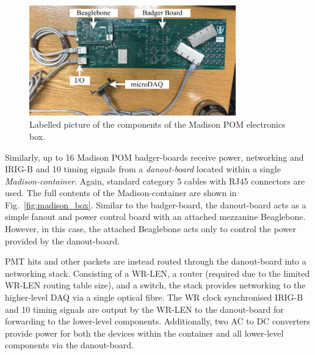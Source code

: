\begin{figure} %
    \includegraphics[width=0.8\textwidth]{diagrams/5-daq/madison_plane.pdf}
    \caption[Labelled picture of the components of the Madison POM electronics box.]
    {Labelled picture of the components of the Madison POM electronics box.}
    \label{fig:madison_plane}
\end{figure}

Similarly, up to 16 Madison POM badger-boards receive power, networking and IRIG-B and
\unit{10}{} timing signals from a \emph{danout-board} located within a single
\emph{Madison-container}. Again, standard category 5 cables with RJ45 connectors are used. The
full contents of the Madison-container are shown in Fig.~\ref{fig:madison_box}. Similar to the
badger-board, the danout-board acts as a simple fanout and power control board with an attached
mezzanine Beaglebone. However, in this case, the attached Beaglebone acts only to control the
power provided by the danout-board.

PMT hits and other packets are instead routed through the danout-board into a networking stack.
Consisting of a WR-LEN, a router (required due to the limited WR-LEN routing table size), and a
switch, the stack provides networking to the higher-level DAQ via a single optical fibre. The WR
clock synchronised IRIG-B and \unit{10}{} timing signals are output by the WR-LEN to
the danout-board for forwarding to the lower-level components. Additionally, two AC to DC
converters provide power for both the devices within the container and all lower-level components
via the danout-board.

